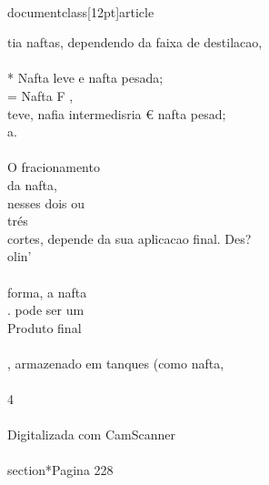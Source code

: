 \\documentclass[12pt]{article}
\begin{document}
{tia naftas, dependendo da faixa de destilacao,\\
\\
* Nafta leve e nafta pesada;\\
= Nafta F ,\\
teve, nafia intermedisria € nafta pesad;\\
a.\\
\\
O fracionamento\\
da nafta,\\
nesses dois ou\\
trés\\
cortes, depende da sua aplicacao final. Des?\\
olin’\\
\\
forma, a nafta\\
. pode ser um\\
Produto final\\
\\}, armazenado em tanques (como nafta,\\
\\
4\\
\\
Digitalizada com CamScanner\\

\\section*{Pagina 228}
\end{document}
